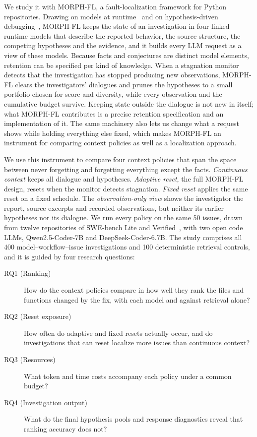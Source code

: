 \documentclass[a4paper,fleqn]{cas-sc}
\newcommand{\tool}{MORPH-FL}
\begin{document}
We study it with \tool{}, a fault-localization framework for Python repositories. Drawing on models at runtime~\citep{modelsruntime2009} and on hypothesis-driven debugging~\citep{zeller2009}, \tool{} keeps the state of an investigation in four linked runtime models that describe the reported behavior, the source structure, the competing hypotheses and the evidence, and it builds every LLM request as a view of these models. Because facts and conjectures are distinct model elements, retention can be specified per kind of knowledge. When a stagnation monitor detects that the investigation has stopped producing new observations, \tool{} clears the investigators' dialogues and prunes the hypotheses to a small portfolio chosen for score and diversity, while every observation and the cumulative budget survive. Keeping state outside the dialogue is not new in itself; what \tool{} contributes is a precise retention specification and an implementation of it. The same machinery also lets us change what a request shows while holding everything else fixed, which makes \tool{} an instrument for comparing context policies as well as a localization approach.

We use this instrument to compare four context policies that span the space between never forgetting and forgetting everything except the facts. \emph{Continuous context} keeps all dialogue and hypotheses. \emph{Adaptive reset}, the full \tool{} design, resets when the monitor detects stagnation. \emph{Fixed reset} applies the same reset on a fixed schedule. The \emph{observation-only view} shows the investigator the report, source excerpts and recorded observations, but neither its earlier hypotheses nor its dialogue. We run every policy on the same 50 issues, drawn from twelve repositories of SWE-bench Lite and Verified~\citep{swebench2024,swebenchverified2024}, with two open code LLMs, Qwen2.5-Coder-7B and DeepSeek-Coder-6.7B. The study comprises all 400 model--workflow--issue investigations and 100 deterministic retrieval controls, and it is guided by four research questions:
\begin{description}
\item[RQ1 (Ranking)] How do the context policies compare in how well they rank the files and functions changed by the fix, with each model and against retrieval alone?
\item[RQ2 (Reset exposure)] How often do adaptive and fixed resets actually occur, and do investigations that can reset localize more issues than continuous context?
\item[RQ3 (Resources)] What token and time costs accompany each policy under a common budget?
\item[RQ4 (Investigation output)] What do the final hypothesis pools and response diagnostics reveal that ranking accuracy does not?
\end{description}
\end{document}
